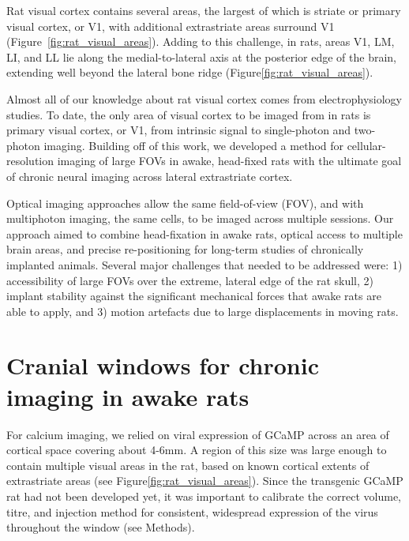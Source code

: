 Rat visual cortex contains several areas, the largest of which is striate or primary visual cortex, or V1, with additional extrastriate areas surround V1 \cite{Espinoza1983RetinotopicRat, Sereno1991} (Figure~\ref{fig:rat_visual_areas}). Adding to this challenge, in rats, areas V1, LM, LI, and LL lie along the medial-to-lateral axis at the posterior edge of the brain, extending well beyond the lateral bone ridge (Figure\ref{fig:rat_visual_areas}). 

Almost all of our knowledge about rat visual cortex comes from electrophysiology studies. To date, the only area of visual cortex to be imaged from in rats is primary visual cortex, or V1, from intrinsic signal \cite{Gias2004} to single-photon \cite{Scott2018ImagingMacroscope} and two-photon \cite{Ohki2005, Greenberg2008} imaging. Building off of this work, we developed a method for cellular-resolution imaging of large FOVs in awake, head-fixed rats with the ultimate goal of chronic neural imaging across lateral extrastriate cortex. 

Optical imaging approaches allow the same field-of-view (FOV), and with multiphoton imaging, the same cells, to be imaged across multiple sessions. Our approach aimed to combine head-fixation in awake rats, optical access to multiple brain areas, and precise re-positioning for long-term studies of chronically implanted animals. Several major challenges that needed to be addressed were:  1) accessibility of large FOVs over the extreme, lateral edge of the rat skull, 2) implant stability against the significant mechanical forces that awake rats are able to apply, and 3) motion artefacts due to large displacements in moving rats. 

\section{Cranial windows for chronic imaging in awake rats}
For calcium imaging, we relied on viral expression of GCaMP across an area of cortical space covering about 4-6mm. A region of this size was large enough to contain multiple visual areas in the rat, based on known cortical extents of extrastriate areas (see Figure\ref{fig:rat_visual_areas}). Since the transgenic GCaMP rat \cite{Scott2018ImagingMacroscope} had not been developed yet, it was important to calibrate the correct volume, titre, and injection method for consistent, widespread expression of the virus throughout the window (see Methods). 

